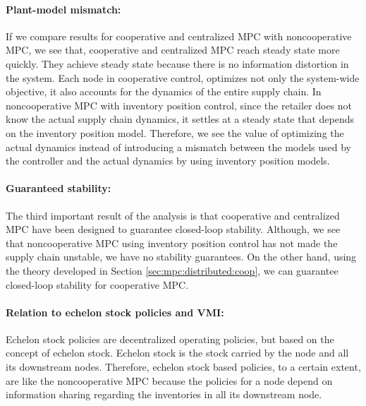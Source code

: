 \paragraph{Plant-model mismatch:}
If we compare results for cooperative and centralized MPC with
noncooperative MPC, we see that, cooperative and centralized MPC reach
steady state more quickly. They achieve  steady state because there is no
information distortion in the system. Each node in cooperative
control,  optimizes not only the system-wide objective, it also
accounts for the dynamics of the entire supply chain. In noncooperative
MPC with inventory position control, since the retailer does not know the actual supply
chain dynamics, it settles at a steady state that depends on the inventory
position model. Therefore, we see the value of optimizing the actual dynamics instead
of introducing a mismatch between the models used by the controller
and the actual dynamics by using inventory position models. 

\paragraph{Guaranteed stability:}
The third important result of the analysis is that cooperative and
centralized MPC have been designed to guarantee closed-loop
stability. Although, we see that noncooperative MPC using inventory
position control has not made the supply chain unstable, we have no
stability guarantees. On the other hand, using the theory developed in
Section \ref{sec:mpc:distributed:coop}, we can guarantee closed-loop stability for
cooperative MPC.

\paragraph{Relation to echelon stock policies and VMI:}
Echelon stock policies are decentralized operating policies, but based
on the concept of echelon stock. Echelon stock is 
the stock carried by the node and all its downstream nodes. Therefore,
echelon stock based policies, to a certain extent, are like the
noncooperative MPC because the policies for a node depend on
information sharing regarding the inventories in all its downstream
node. 


